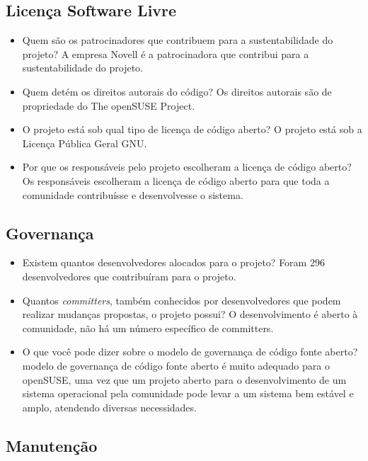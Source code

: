\documentclass[12pt,a4paper]{article} %
\begin{document}
\subsection{Licença Software Livre}


\begin{itemize}
\item Quem são os patrocinadores que contribuem para a sustentabilidade do projeto?
A empresa Novell é a patrocinadora que contribui para a sustentabilidade do projeto.
\item Quem detém os direitos autorais do código?
Os direitos autorais são de propriedade do The openSUSE Project.
\item O projeto está sob qual tipo de licença de código aberto?
O projeto está sob a Licença Pública Geral GNU.
\item Por que os responsáveis pelo projeto escolheram a licença de código aberto?
Os responsáveis escolheram a licença de código aberto para que toda a comunidade contribuísse e desenvolvesse o sistema.
\end{itemize}

\subsection{Governança}


\begin{itemize}
\item Existem quantos desenvolvedores alocados para o projeto?
Foram 296 desenvolvedores que contribuíram para o projeto.
\item Quantos \textit{committers}, também conhecidos por desenvolvedores que podem realizar mudanças propostas, o projeto possui?
O desenvolvimento é aberto à comunidade, não há um número específico de committers.
\item O que você pode dizer sobre o modelo de governança de código fonte aberto?
 modelo de governança de código fonte aberto é muito adequado para o openSUSE, uma vez que um projeto aberto para o desenvolvimento de um sistema operacional pela comunidade pode levar a um sistema bem estável e amplo, atendendo diversas necessidades.
\end{itemize}

\subsection{Manutenção}
\end{document}
